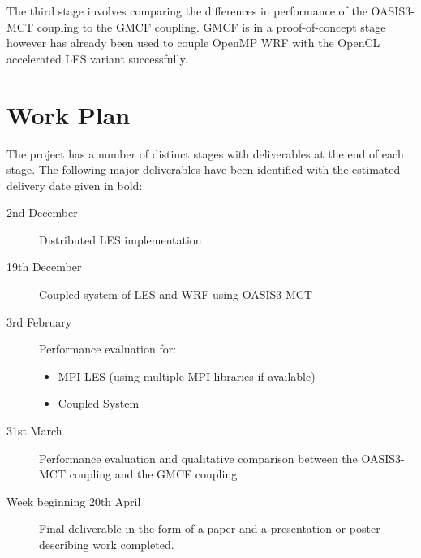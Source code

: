 \documentclass{acm_proc_article-sp}
\begin{document}
The third stage involves comparing the differences in performance of the
OASIS3-MCT coupling to the GMCF coupling. GMCF is in a proof-of-concept stage
however has already been used to couple OpenMP WRF with the OpenCL accelerated
LES variant successfully.

\section*{Work Plan}

The project has a number of distinct stages with deliverables at the end of each
stage. The following major deliverables have been identified with the estimated
delivery date given in bold:

\begin{description}
	\item[2nd December] Distributed LES implementation
	\item[19th December] Coupled system of LES and WRF using OASIS3-MCT
	\item[3rd February] Performance evaluation for:
    \begin{itemize}
        \item MPI LES (using multiple MPI libraries if available)
        \item Coupled System
    \end{itemize}
	\item[31st March] Performance evaluation and qualitative comparison between
    the OASIS3-MCT coupling and the GMCF coupling
    \item[Week beginning 20th April] Final deliverable in the form of a paper
    and a presentation or poster describing work completed.
\end{description}



\end{document}
